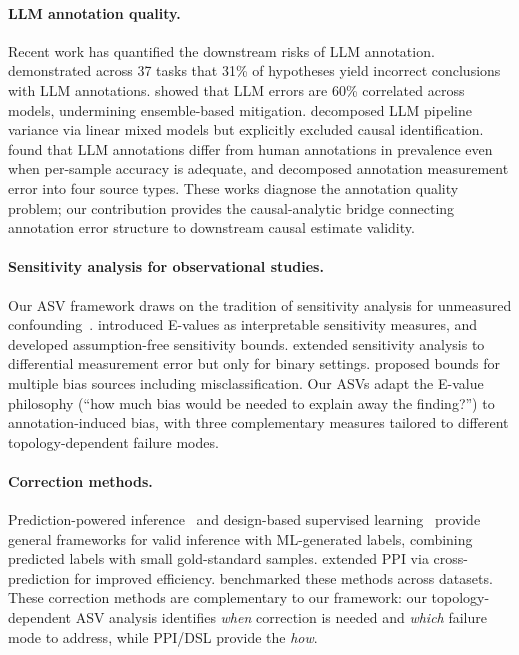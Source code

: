 \paragraph{LLM annotation quality.}
Recent work has quantified the downstream risks of LLM annotation. \citet{baumann2025} demonstrated across 37 tasks that 31\% of hypotheses yield incorrect conclusions with LLM annotations. \citet{kim_garg2025} showed that LLM errors are 60\% correlated across models, undermining ensemble-based mitigation. \citet{messing2026} decomposed LLM pipeline variance via linear mixed models but explicitly excluded causal identification. \citet{stolwijk_boukes_trilling2025} found that LLM annotations differ from human annotations in prevalence even when per-sample accuracy is adequate, and \citet{cheng_mayya_sedoc2024} decomposed annotation measurement error into four source types. These works diagnose the annotation quality problem; our contribution provides the causal-analytic bridge connecting annotation error structure to downstream causal estimate validity.

\paragraph{Sensitivity analysis for observational studies.}
Our ASV framework draws on the tradition of sensitivity analysis for unmeasured confounding~\cite{rosenbaum2002}. \citet{vanderweele_ding2017} introduced E-values as interpretable sensitivity measures, and \citet{ding_vanderweele2016} developed assumption-free sensitivity bounds. \citet{vanderweele_li2019} extended sensitivity analysis to differential measurement error but only for binary settings. \citet{smith_vanderweele2021} proposed bounds for multiple bias sources including misclassification. Our ASVs adapt the E-value philosophy (``how much bias would be needed to explain away the finding?'') to annotation-induced bias, with three complementary measures tailored to different topology-dependent failure modes.

\paragraph{Correction methods.}
Prediction-powered inference~\cite{angelopoulos2023} and design-based supervised learning~\cite{egami_hinck_stewart_wei2023, gligoric2025} provide general frameworks for valid inference with ML-generated labels, combining predicted labels with small gold-standard samples. \citet{zrnic_candes2024} extended PPI via cross-prediction for improved efficiency. \citet{audinet2025} benchmarked these methods across datasets. These correction methods are complementary to our framework: our topology-dependent ASV analysis identifies \emph{when} correction is needed and \emph{which} failure mode to address, while PPI/DSL provide the \emph{how}.
